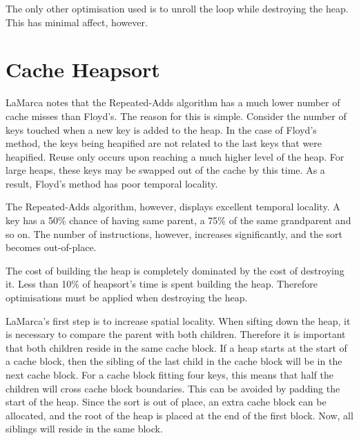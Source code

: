 The only other optimisation used is to unroll the loop while destroying the
heap. This has minimal affect, however.

\section{Cache Heapsort}

LaMarca notes that the Repeated-Adds algorithm has a much lower number of cache
misses than Floyd's. The reason for this is simple. Consider the number of keys 
touched when a new key is added to the heap. In the case of Floyd's method, the
keys being heapified are not related to the last keys that were heapified. Reuse
only occurs upon reaching a much higher level of the heap. For large heaps, these
keys may be swapped out of the cache by this time. As a result, Floyd's method
has poor temporal locality.

The Repeated-Adds algorithm, however, displays excellent temporal locality. A
key has a 50\% chance of having same parent, a 75\% of the same grandparent and
so on. The number of instructions, however, increases significantly, and the
sort becomes out-of-place.

The cost of building the heap is completely dominated by the cost of
destroying it. Less than 10\% of heapsort's time is spent building the heap.
Therefore optimisations must be applied when destroying the heap.

LaMarca's first step is to increase spatial locality. When sifting down the
heap, it is necessary to compare the parent with both children. Therefore it is
important that both children reside in the same cache block. If a heap starts at
the start of a cache block, then the sibling of the last child in the cache
block will be in the next cache block.  For a cache block fitting four keys,
this means that half the children will cross cache block boundaries. This can be
avoided by padding the start of the heap. Since the sort is out of place, an
extra cache block can be allocated, and the root of the heap is placed at the end of
the first block. Now, all siblings will reside in the same block.

\begin{figure}[h]
\centering
{}
\end{figure}

